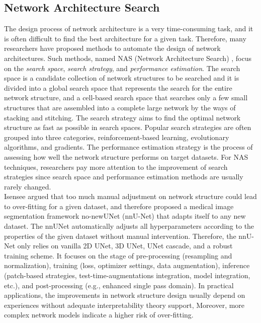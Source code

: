\subsection{Network Architecture Search}
The design process of network architecture is a very time-consuming task, and
it is often difficult to find the best architecture for a given task. Therefore,
many researchers have proposed methods to automate the design of network
architectures. Such methods, named NAS (Network Architecture Search)
\cite{elsken2019nassurvery}, focus on the \emph{search space}, \emph{search
strategy}, and \emph{performance estimation}.
The search space is a candidate collection of network structures to be searched
and it is divided into a global search space that represents the search for the
entire network structure, and a cell-based search space that searches only a few
small structures that are assembled into a complete large network by the ways of
stacking and stitching. The search strategy aims to find the optimal network
structure as fast as possible in search spaces. Popular search strategies are
often grouped into three categories, reinforcement-based learning, evolutionary
algorithms, and gradients. The performance estimation strategy is the process of
assessing how well the network structure performs on target datasets. For NAS
techniques, researchers pay more attention to the improvement of search
strategies since search space and performance estimation methods are usually
rarely changed.\\
Isensee \etal \cite{isensee2018nnu} argued that too much manual adjustment on
network structure could lead to over-fitting for a given dataset, and therefore
proposed a medical image segmentation framework no-newUNet (nnU-Net) that adapts
itself to any new dataset. The nnUNet automatically adjusts all hyperparameters
according to the properties of the given dataset without manual intervention.
Therefore, the nnU-Net only relies on vanilla 2D UNet, 3D UNet, UNet cascade,
and a robust training scheme. It focuses on the stage of pre-processing
(resampling and normalization), training (loss, optimizer settings, data
augmentation), inference (patch-based strategies, test-time-augmentations
integration, model integration, etc.), and post-processing (e.g., enhanced
single pass domain). In practical applications, the improvements in network
structure design usually depend on experiences without adequate interpretability
theory support, Moreover, more complex network models indicate a higher risk of
over-fitting.

